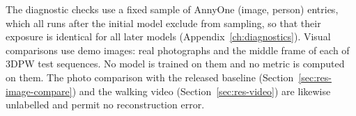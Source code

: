 The diagnostic checks use a fixed sample of \DataManifestTotal{} AnnyOne (image, person) entries, which all runs
after the initial model exclude from sampling, so that their exposure is identical for all later models
(Appendix~\ref{ch:diagnostics}). Visual comparisons use \DataDemoTotal{} demo images: \DataDemoPhotos{} real
photographs and the middle frame of each of
\DataDemoFrames{} 3DPW test sequences. No model is trained on them and no metric is computed on them. The photo
comparison with the released baseline (Section~\ref{sec:res-image-compare}) and the walking video
(Section~\ref{sec:res-video}) are likewise unlabelled and permit no reconstruction error.
